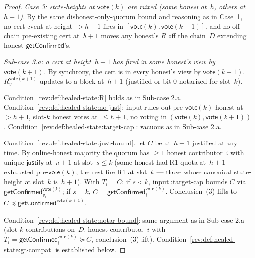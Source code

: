 \ifx\litemode\undefined\documentclass{article}\fi
\newcommand{\just}{\ensuremath{\mathsf{justify}}\xspace}
\newcommand{\vote}{\mathsf{vote}}
\newcommand{\getConfirmed}{\textsf{getConfirmed}\xspace}
\theoremstyle{plain}
\theoremstyle{definition}
\theoremstyle{remark}
\newcommand{\OHM}{online-honest majority\xspace}
\begin{document}
\begin{proof}
\emph{Case 3: state-heights at $\vote(k)$ are mixed (some honest at~$h$, others at~$h+1$).}
By the same dishonest-only-quorum bound and  reasoning as in Case~1, no cert event at height~$>h+1$ fires in $[\vote(k),\vote(k+1)]$, and no off-chain pre-existing cert at~$h+1$ moves any honest's $R$ off the chain~$D$ extending honest $\getConfirmed$'s.

\emph{Sub-case 3.a: a cert at height~$h+1$ has fired in some honest's view by $\vote(k+1)$.}
By synchrony, the cert is in every honest's view by $\vote(k+1)$. $R_v^{\vote(k+1)}$ updates to a block at~$h+1$ (justified or bit-$0$ notarized for slot~$k$).

Condition~\ref{rev:def:healed-state:R} holds as in Sub-case 2.a. Condition~\ref{rev:def:healed-state:no-just}: input rules out pre-$\vote(k)$ honest at~$>h+1$, slot-$k$ honest votes at~$\leq h+1$, no voting in $(\vote(k),\vote(k+1))$. Condition~\ref{rev:def:healed-state:target-cap}: vacuous as in Sub-case 2.a.

Condition~\ref{rev:def:healed-state:just-bound}: let $C$ be at~$h+1$ justified at any time. By \OHM the quorum has $\geq 1$ honest contributor~$i$ with unique \just at~$h+1$ at slot~$s \leq k$ (some honest had R1 quota at~$h+1$ exhausted pre-$\vote(k)$; the rest fire R1 at slot~$k$ — those whose canonical state-height at slot~$k$ is~$h+1$). With $T_i = C$: if $s < k$, input :target-cap bounds $C$ via $\getConfirmed_{v_\ell}^{\vote(k)}$; if $s = k$, $C = \getConfirmed_i^{\vote(k)}$. Conclusion~(3) lifts to $C \preceq \getConfirmed_{\,\cdot\,}^{\vote(k+1)}$.

Condition~\ref{rev:def:healed-state:notar-bound}: same argument as in Sub-case 2.a (slot-$k$ contributions on~$D$, honest contributor~$i$ with $T_i = \getConfirmed_i^{\vote(k)} \succeq C$, conclusion~(3) lift). Condition~\ref{rev:def:healed-state:gt-compat} is established below.


\end{proof}
\end{document}
